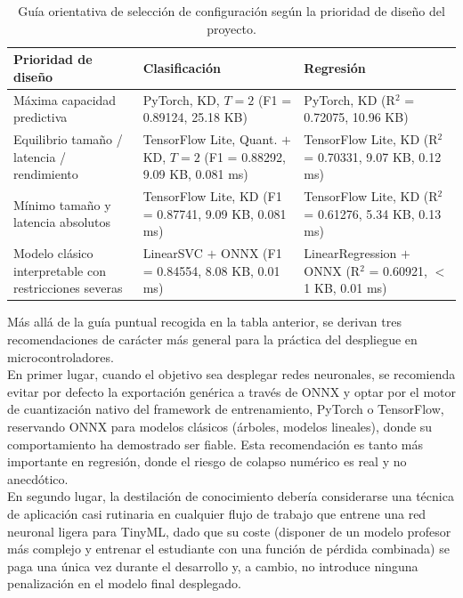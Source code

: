\documentclass[a4paper,12pt,twoside,final]{book}
\begin{document}
\begin{table}[htbp]
  \centering
  \begin{tabularx}{\textwidth}{lXX}
    \hline
    \textbf{Prioridad de diseño} & \textbf{Clasificación} & \textbf{Regresión} \\
    \hline
    Máxima capacidad predictiva &
    PyTorch, KD, $T=2$ (F1 = 0.89124, 25.18 KB) &
    PyTorch, KD (R$^2$ = 0.72075, 10.96 KB) \\
    \hline
    Equilibrio tamaño / latencia / rendimiento &
    TensorFlow Lite, Quant. $+$ KD, $T=2$ (F1 = 0.88292, 9.09 KB, 0.081 ms) &
    TensorFlow Lite, KD (R$^2$ = 0.70331, 9.07 KB, 0.12 ms) \\
    \hline
    Mínimo tamaño y latencia absolutos &
    TensorFlow Lite, KD (F1 = 0.87741, 9.09 KB, 0.081 ms) &
    TensorFlow Lite, KD (R$^2$ = 0.61276, 5.34 KB, 0.13 ms) \\
    \hline
    Modelo clásico interpretable con restricciones severas &
    LinearSVC $+$ ONNX (F1 = 0.84554, 8.08 KB, 0.01 ms) &
    LinearRegression $+$ ONNX (R$^2$ = 0.60921, $<$1 KB, 0.01 ms) \\
    \hline
  \end{tabularx}
  \caption{Guía orientativa de selección de configuración según la prioridad de diseño del proyecto.}
  \label{tab:guia_seleccion}
\end{table}
 
Más allá de la guía puntual recogida en la tabla anterior, se derivan tres recomendaciones de carácter
más general para la práctica del despliegue en microcontroladores.\\
 
En primer lugar, cuando el objetivo sea desplegar redes neuronales, se recomienda evitar por defecto la exportación
genérica a través de ONNX y optar por el motor de cuantización nativo del framework de entrenamiento, PyTorch o
TensorFlow, reservando ONNX para modelos clásicos (árboles, modelos lineales), donde su comportamiento ha demostrado
ser fiable. Esta recomendación es tanto más importante en regresión, donde el riesgo de colapso numérico es real y no
anecdótico.\\
 
En segundo lugar, la destilación de conocimiento debería considerarse una técnica de aplicación casi rutinaria en
cualquier flujo de trabajo que entrene una red neuronal ligera para TinyML, dado que su coste (disponer de un modelo
profesor más complejo y entrenar el estudiante con una función de pérdida combinada) se paga una única vez durante
el desarrollo y, a cambio, no introduce ninguna penalización en el modelo final desplegado.\\
 
\end{document}
